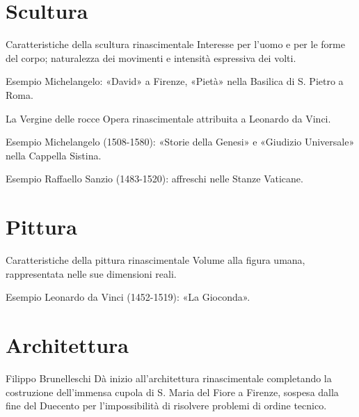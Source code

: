 \documentclass[12pt]{article}
\begin{document}
\section{Scultura}


\begin{defn}{Caratteristiche della scultura rinascimentale}
Interesse per l'uomo e per le forme del corpo; naturalezza dei movimenti e intensità espressiva dei volti.
\end{defn}


\begin{ex}{Esempio}
Michelangelo: «David» a Firenze, «Pietà» nella Basilica di S. Pietro a Roma.
\end{ex}


\begin{defn}{La Vergine delle rocce}
Opera rinascimentale attribuita a Leonardo da Vinci.
\end{defn}


\begin{ex}{Esempio}
Michelangelo (1508-1580): «Storie della Genesi» e «Giudizio Universale» nella Cappella Sistina.
\end{ex}


\begin{ex}{Esempio}
Raffaello Sanzio (1483-1520): affreschi nelle Stanze Vaticane.
\end{ex}


\section{Pittura}


\begin{defn}{Caratteristiche della pittura rinascimentale}
Volume alla figura umana, rappresentata nelle sue dimensioni reali.
\end{defn}


\begin{ex}{Esempio}
Leonardo da Vinci (1452-1519): «La Gioconda».
\end{ex}


\section{Architettura}


\begin{defn}{Filippo Brunelleschi}
Dà inizio all'architettura rinascimentale completando la costruzione dell'immensa cupola di S. Maria del Fiore a Firenze, sospesa dalla fine del Duecento per l'impossibilità di risolvere problemi di ordine tecnico.
\end{defn}
\end{document}
